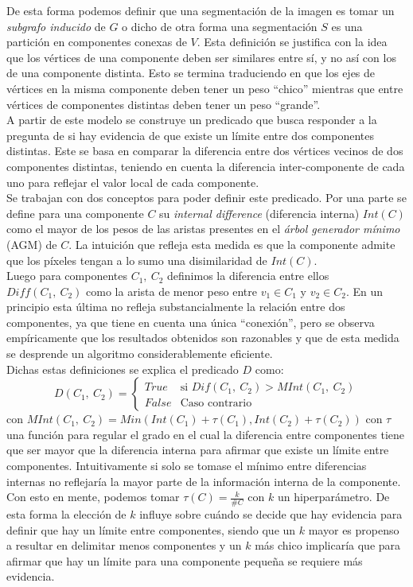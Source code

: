 \indent De esta forma podemos definir que una segmentaci\'on de la imagen es tomar un \textit{subgrafo inducido} de $G$ o dicho de otra forma una segmentaci\'on $S$ es una partici\'on en componentes conexas de $V$. Esta definici\'on se justifica con la idea que los vértices de una componente deben ser similares entre sí, y no as\'i con los de una componente distinta. Esto se termina traduciendo en que los ejes de vértices en la misma componente deben tener un peso ``chico'' mientras que entre vértices de componentes distintas deben tener un peso ``grande''.\\
\indent A partir de este modelo se construye un predicado que busca responder a la pregunta de si hay evidencia de que existe un l\'imite entre dos componentes distintas. Este se basa en comparar la diferencia entre dos vértices vecinos de dos componentes distintas, teniendo en cuenta la diferencia inter-componente de cada uno para reflejar el valor local de cada componente.\\
\indent Se trabajan con dos conceptos para poder definir este predicado. Por una parte se define para una componente $C$ su \textit{internal difference} (diferencia interna) $Int(C)$ como el mayor de los pesos de las aristas presentes en el \textit{árbol generador m\'inimo} (AGM) de $C$. La intuici\'on que refleja esta medida es que la componente admite que los píxeles tengan a lo sumo una disimilaridad de $Int(C)$.\\
\indent Luego para componentes $C_1, \ C_2$ definimos la diferencia entre ellos $Diff(C_1,\ C_2)$  como la arista de menor peso entre $v_1\in C_1$ y $v_2 \in C_2$. En un principio esta última no refleja substancialmente la relaci\'on entre dos componentes, ya que tiene en cuenta una única ``conexi\'on'', pero se observa empíricamente que los resultados obtenidos son razonables y que de esta medida se desprende un algoritmo considerablemente eficiente.\\
\indent Dichas estas definiciones se explica el predicado $D$ como:
\[
	D(C_1,\ C_2)=\begin{cases}
               		True            & \text{si } Dif(C_1, \ C_2)>MInt(C_1,\ C_2)\\
               		False			& \text{Caso contrario}
           		 \end{cases}
\]
con $MInt(C_1, \ C_2)=Min(Int(C_1) + \tau(C_1), Int(C_2) + \tau(C_2))$ con $\tau$ una funci\'on para regular el grado en el cual la diferencia entre componentes tiene que ser mayor que la diferencia interna para afirmar que existe un l\'imite entre componentes. Intuitivamente si solo se tomase el m\'inimo entre diferencias internas no reflejar\'ia la mayor parte de la informaci\'on interna de la componente. Con esto en mente, podemos tomar $\tau(C)=\frac{k}{\#C}$ con $k$ un hiperparámetro. De esta forma la elecci\'on de $k$ influye sobre cuándo se decide que hay evidencia para definir que hay un l\'imite entre componentes, siendo que un $k$ mayor es propenso a resultar en delimitar menos componentes y un $k$ más chico implicar\'ia que para afirmar que hay un l\'imite para una componente peque\~na se requiere m\'as evidencia. \\
